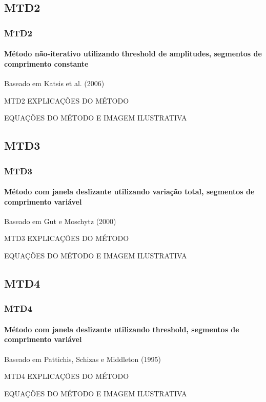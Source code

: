\documentclass{beamer}
\begin{document}
	
	\subsection[MTD2]{MTD2}
	\begin{frame}
		\frametitle{MTD2}
		\framesubtitle{Método não-iterativo utilizando threshold de amplitudes, segmentos de comprimento constante}
		
		Baseado em Katsis et al. (2006)
		
		\begin{block}{MTD2}
			EXPLICAÇÕES DO MÉTODO
		\end{block}
		
		EQUAÇÕES DO MÉTODO E IMAGEM ILUSTRATIVA
		
	\end{frame}
	
	\subsection[MTD3]{MTD3}
	\begin{frame}
		\frametitle{MTD3}
		\framesubtitle{Método com janela deslizante utilizando variação total, segmentos de comprimento variável}
		
		Baseado em Gut e Moschytz (2000)
		
		\begin{block}{MTD3}
			EXPLICAÇÕES DO MÉTODO
		\end{block}
		
		EQUAÇÕES DO MÉTODO E IMAGEM ILUSTRATIVA
		
	\end{frame}
	
	\subsection[MTD4]{MTD4}
	\begin{frame}
		\frametitle{MTD4}
		\framesubtitle{Método com janela deslizante utilizando threshold, segmentos de comprimento variável}
		
		Baseado em Pattichis, Schizas e Middleton (1995)
		
		\begin{block}{MTD4}
			EXPLICAÇÕES DO MÉTODO
		\end{block}
		
		EQUAÇÕES DO MÉTODO E IMAGEM ILUSTRATIVA
		
	\end{frame}
\end{document}
